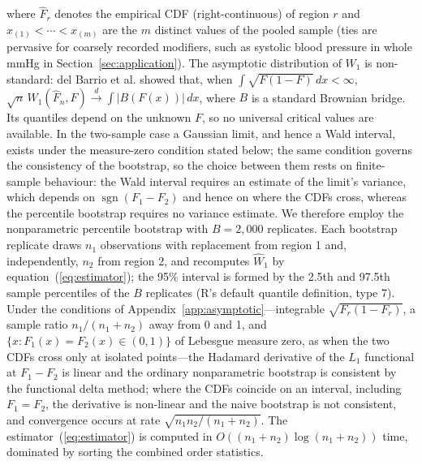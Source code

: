 \documentclass[AMA,Times1COL]{WileyNJDv5}
\begin{document}
where $\hat{F}_r$ denotes the empirical CDF (right-continuous) of region $r$ and $x_{(1)} < \cdots < x_{(m)}$ are the $m$ distinct values of the pooled sample (ties are pervasive for coarsely recorded modifiers, such as systolic blood pressure in whole mmHg in Section~\ref{sec:application}). The asymptotic distribution of $W_1$ is non-standard: del Barrio et al.\cite{delbarrio1999} showed that, when $\int \sqrt{F(1-F)}\,dx < \infty$, $\sqrt{n}\,W_1(\hat{F}_n, F) \xrightarrow{d} \int |B(F(x))|\,dx$, where $B$ is a standard Brownian bridge. Its quantiles depend on the unknown $F$, so no universal critical values are available. In the two-sample case a Gaussian limit, and hence a Wald interval, exists under the measure-zero condition stated below; the same condition governs the consistency of the bootstrap, so the choice between them rests on finite-sample behaviour: the Wald interval requires an estimate of the limit's variance, which depends on $\operatorname{sgn}(F_1 - F_2)$ and hence on where the CDFs cross, whereas the percentile bootstrap requires no variance estimate. We therefore employ the nonparametric percentile bootstrap with $B = 2{,}000$ replicates.\cite{efron1993} Each bootstrap replicate draws $n_1$ observations with replacement from region 1 and, independently, $n_2$ from region 2, and recomputes $\widehat{W}_1$ by equation~(\ref{eq:estimator}); the 95\% interval is formed by the 2.5th and 97.5th sample percentiles of the $B$ replicates (R's default quantile definition, type 7). Under the conditions of Appendix~\ref{app:asymptotic}---integrable $\sqrt{F_r(1 - F_r)}$, a sample ratio $n_1/(n_1 + n_2)$ away from 0 and 1, and $\{x : F_1(x) = F_2(x) \in (0,1)\}$ of Lebesgue measure zero, as when the two CDFs cross only at isolated points---the Hadamard derivative of the $L_1$ functional at $F_1 - F_2$ is linear and the ordinary nonparametric bootstrap is consistent by the functional delta method;\cite{fang2019} where the CDFs coincide on an interval, including $F_1 = F_2$, the derivative is non-linear and the naive bootstrap is not consistent,\cite{dumbgen1993,fang2019,sommerfeld2018} and convergence occurs at rate $\sqrt{n_1 n_2/(n_1+n_2)}$. The estimator~(\ref{eq:estimator}) is computed in $O((n_1 + n_2) \log(n_1 + n_2))$ time, dominated by sorting the combined order statistics.
\end{document}
